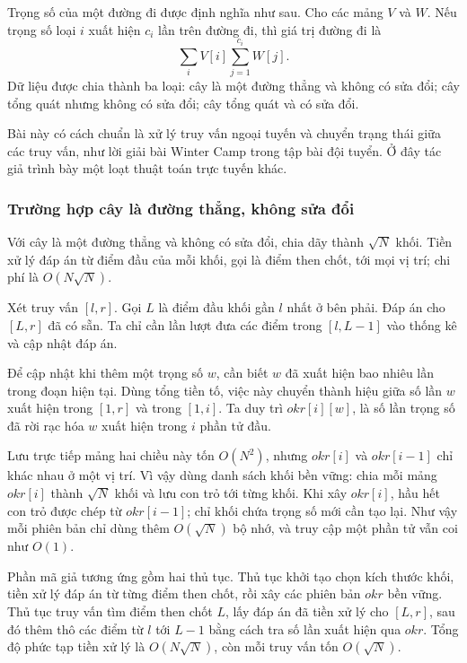 \documentclass[11pt]{article}
\begin{document}
Trọng số của một đường đi được định nghĩa như sau. Cho các mảng \(V\) và
\(W\). Nếu trọng số loại \(i\) xuất hiện \(c_i\) lần trên đường đi, thì giá
trị đường đi là
\[
  \sum_i V[i]\sum_{j=1}^{c_i} W[j].
\]
Dữ liệu được chia thành ba loại: cây là một đường thẳng và không có sửa đổi;
cây tổng quát nhưng không có sửa đổi; cây tổng quát và có sửa đổi.

Bài này có cách chuẩn là xử lý truy vấn ngoại tuyến và chuyển trạng thái giữa
các truy vấn, như lời giải bài Winter Camp trong tập bài đội tuyển. Ở đây tác
giả trình bày một loạt thuật toán trực tuyến khác.

\subsubsection{Trường hợp cây là đường thẳng, không sửa đổi}

Với cây là một đường thẳng và không có sửa đổi, chia dãy thành \(\sqrt N\)
khối. Tiền xử lý đáp án từ điểm đầu của mỗi khối, gọi là điểm then chốt, tới
mọi vị trí; chi phí là \(O(N\sqrt N)\).

Xét truy vấn \([l,r]\). Gọi \(L\) là điểm đầu khối gần \(l\) nhất ở bên phải.
Đáp án cho \([L,r]\) đã có sẵn. Ta chỉ cần lần lượt đưa các điểm trong
\([l,L-1]\) vào thống kê và cập nhật đáp án.

Để cập nhật khi thêm một trọng số \(w\), cần biết \(w\) đã xuất hiện bao nhiêu
lần trong đoạn hiện tại. Dùng tổng tiền tố, việc này chuyển thành hiệu giữa
số lần \(w\) xuất hiện trong \([1,r]\) và trong \([1,i]\). Ta duy trì
\(\mathit{okr}[i][w]\), là số lần trọng số đã rời rạc hóa \(w\) xuất hiện
trong \(i\) phần tử đầu.

Lưu trực tiếp mảng hai chiều này tốn \(O(N^2)\), nhưng
\(\mathit{okr}[i]\) và \(\mathit{okr}[i-1]\) chỉ khác nhau ở một vị trí. Vì
vậy dùng danh sách khối bền vững: chia mỗi mảng \(\mathit{okr}[i]\) thành
\(\sqrt N\) khối và lưu con trỏ tới từng khối. Khi xây \(\mathit{okr}[i]\),
hầu hết con trỏ được chép từ \(\mathit{okr}[i-1]\); chỉ khối chứa trọng số
mới cần tạo lại. Như vậy mỗi phiên bản chỉ dùng thêm \(O(\sqrt N)\) bộ nhớ,
và truy cập một phần tử vẫn coi như \(O(1)\).

Phần mã giả tương ứng gồm hai thủ tục. Thủ tục khởi tạo chọn kích thước khối,
tiền xử lý đáp án từ từng điểm then chốt, rồi xây các phiên bản
\(\mathit{okr}\) bền vững. Thủ tục truy vấn tìm điểm then chốt \(L\), lấy đáp
án đã tiền xử lý cho \([L,r]\), sau đó thêm thô các điểm từ \(l\) tới
\(L-1\) bằng cách tra số lần xuất hiện qua \(\mathit{okr}\). Tổng độ phức tạp
tiền xử lý là \(O(N\sqrt N)\), còn mỗi truy vấn tốn \(O(\sqrt N)\).
\end{document}
